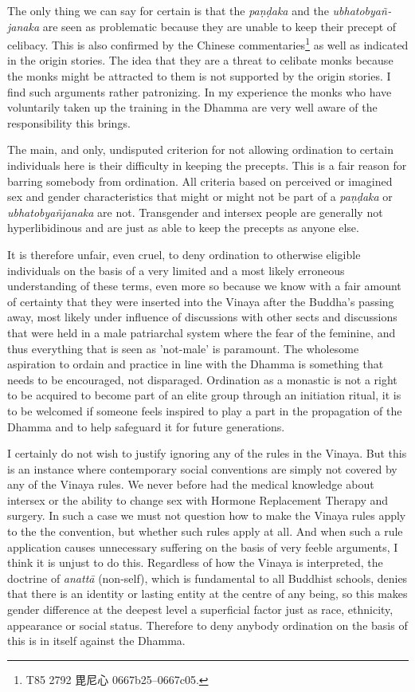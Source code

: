 The only thing we can say for certain is that the {\em paṇḍaka} and the {\em ubhatob­yañ­janaka} are seen as problematic because they are unable to keep their precept of celibacy. This is also confirmed by the Chinese commentaries\footnote{T85 2792 毘尼心 0667b25–0667c05.} as well as indicated in the origin stories. The idea that they are a threat to celibate monks because the monks might be attracted to them is not supported by the origin stories. I find such arguments rather patronizing. In my experience the monks who have voluntarily taken up the training in the Dhamma are very well aware of the responsibility this brings.

The main, and only, undisputed criterion for not allowing ordination to certain individuals here is their difficulty in keeping the precepts. This is a fair reason for barring somebody from ordination. All criteria based on perceived or imagined sex and gender characteristics that might or might not be part of a {\em paṇḍaka} or {\em ubhatob­yañ­janaka} are not. Transgender and intersex people are generally not hyperlibidinous and are just as able to keep the precepts as anyone else. 

It is therefore unfair, even cruel, to deny ordination to otherwise eligible individuals on the basis of a very limited and a most likely erroneous understanding of these terms, even more so because we know with a fair amount of certainty that they were inserted into the Vinaya after the Buddha's passing away, most likely under influence of discussions with other sects and discussions that were held in a male patriarchal system where the fear of the feminine, and thus everything that is seen as 'not-male' is paramount. The wholesome aspiration to ordain and practice in line with the Dhamma is something that needs to be encouraged, not disparaged. Ordination as a monastic is not a right to be acquired to become part of an elite group through an initiation ritual, it is to be welcomed if someone feels inspired to play a part in the propagation of the Dhamma and to help safeguard it for future generations. 

I certainly do not wish to justify ignoring any of the rules in the Vinaya. But this is an instance where contemporary social conventions are simply not covered by any of the Vinaya rules. We never before had the medical knowledge about intersex or the ability to change sex with Hormone Replacement Therapy and surgery. In such a case we must not question how to make the Vinaya rules apply to the the convention, but whether such rules apply at all. And when such a rule application causes unnecessary suffering on the basis of very feeble arguments, I think it is unjust to do this. Regardless of how the Vinaya is interpreted, the doctrine of {\em anattā} (non-self), which is fundamental to all Buddhist schools, denies that there is an identity or lasting entity at the centre of any being, so this makes gender difference at the deepest level a superficial factor just as race, ethnicity, appearance or social status. Therefore to deny anybody ordination on the basis of this is in itself against the Dhamma.


